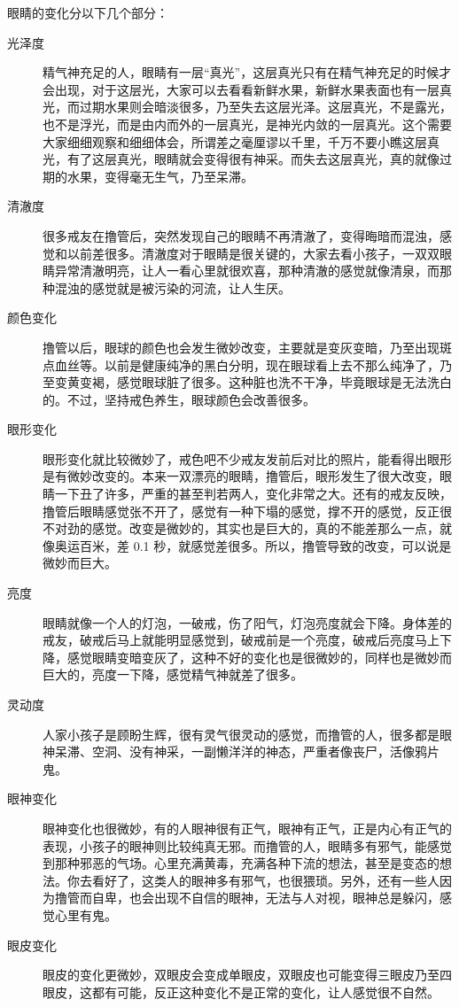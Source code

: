 \documentclass{ctexart}
\begin{document}
眼睛的变化分以下几个部分：
\begin{description}
    \item[光泽度] 精气神充足的人，眼睛有一层“真光”，这层真光只有在精气神充足的时候才会出现，对于这层光，大家可以去看看新鲜水果，新鲜水果表面也有一层真光，而过期水果则会暗淡很多，乃至失去这层光泽。这层真光，不是露光，也不是浮光，而是由内而外的一层真光，是神光内敛的一层真光。这个需要大家细细观察和细细体会，所谓差之毫厘谬以千里，千万不要小瞧这层真光，有了这层真光，眼睛就会变得很有神采。而失去这层真光，真的就像过期的水果，变得毫无生气，乃至呆滞。
    \item[清澈度] 很多戒友在撸管后，突然发现自己的眼睛不再清澈了，变得晦暗而混浊，感觉和以前差很多。清澈度对于眼睛是很关键的，大家去看小孩子，一双双眼睛异常清澈明亮，让人一看心里就很欢喜，那种清澈的感觉就像清泉，而那种混浊的感觉就是被污染的河流，让人生厌。
    \item[颜色变化] 撸管以后，眼球的颜色也会发生微妙改变，主要就是变灰变暗，乃至出现斑点血丝等。以前是健康纯净的黑白分明，现在眼球看上去不那么纯净了，乃至变黄变褐，感觉眼球脏了很多。这种脏也洗不干净，毕竟眼球是无法洗白的。不过，坚持戒色养生，眼球颜色会改善很多。
    \item[眼形变化] 眼形变化就比较微妙了，戒色吧不少戒友发前后对比的照片，能看得出眼形是有微妙改变的。本来一双漂亮的眼睛，撸管后，眼形发生了很大改变，眼睛一下丑了许多，严重的甚至判若两人，变化非常之大。还有的戒友反映，撸管后眼睛感觉张不开了，感觉有一种下塌的感觉，撑不开的感觉，反正很不对劲的感觉。改变是微妙的，其实也是巨大的，真的不能差那么一点，就像奥运百米，差 0.1 秒，就感觉差很多。所以，撸管导致的改变，可以说是微妙而巨大。
    \item[亮度] 眼睛就像一个人的灯泡，一破戒，伤了阳气，灯泡亮度就会下降。身体差的戒友，破戒后马上就能明显感觉到，破戒前是一个亮度，破戒后亮度马上下降，感觉眼睛变暗变灰了，这种不好的变化也是很微妙的，同样也是微妙而巨大的，亮度一下降，感觉精气神就差了很多。
    \item[灵动度] 人家小孩子是顾盼生辉，很有灵气很灵动的感觉，而撸管的人，很多都是眼神呆滞、空洞、没有神采，一副懒洋洋的神态，严重者像丧尸，活像鸦片鬼。
    \item[眼神变化] 眼神变化也很微妙，有的人眼神很有正气，眼神有正气，正是内心有正气的表现，小孩子的眼神则比较纯真无邪。而撸管的人，眼睛多有邪气，能感觉到那种邪恶的气场。心里充满黄毒，充满各种下流的想法，甚至是变态的想法。你去看好了，这类人的眼神多有邪气，也很猥琐。另外，还有一些人因为撸管而自卑，也会出现不自信的眼神，无法与人对视，眼神总是躲闪，感觉心里有鬼。
    \item[眼皮变化] 眼皮的变化更微妙，双眼皮会变成单眼皮，双眼皮也可能变得三眼皮乃至四眼皮，这都有可能，反正这种变化不是正常的变化，让人感觉很不自然。

\end{description}
\end{document}
